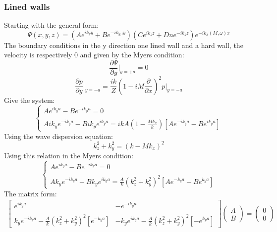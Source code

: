 \subsubsection*{Lined walls}\label{sec:EigenvalueLined}
Starting with the general form:
\begin{equation}
        \Psi(x,y,z)=(Ae^{ik_{y}y}+Be^{-ik_{y,l}y})(Ce^{ik_{z}z}+Dne^{-ik_{z}z})e^{-ik_{x}(M,\omega)x}
\end{equation}
The boundary conditions in the y direction one lined wall and a hard wall, the velocity is respectively 0 and given by the Myers condition:
\begin{equation}
    \frac{\partial\Psi}{\partial y} \Big|_{y=+a}=0
\end{equation}
\begin{equation}
    \frac{\partial p}{\partial y}\Bigg|_{y=-a}=\frac{ik}{Z}(1-iM\frac{\partial}{\partial x})^2 p\Bigg|_{y=-a}
\end{equation}
Give the system:
\begin{equation}\label{eq:2}
    \left\{
    \begin{array}{ll}
    Ae^{ik_ya}-Be^{-ik_ya}=0\\
        \\
    Aik_ye^{-ik_ya}-Bik_ye^{ik_ya}=ikA(1-\frac{Mk_x}{k})[Ae^{-ik_ya}-Be^{ik_ya}]
    \end{array}
    \right.
\end{equation}
Using the wave dispersion equation:
\begin{equation}
   k_z^2+k_y^2=(k-Mk_x)^2 
\end{equation}
Using this relation in the Myers condition:
\begin{equation}
    \left\{
    \begin{array}{ll}
    Ae^{ik_ya}-Be^{-ik_ya}=0\\
        \\
    Ak_ye^{-ik_ya}-Bk_ye^{ik_ya}=\frac{A}{k}(k_z^2+k_y^2)^2[Ae^{-k_ya}-Be^{k_ya}]
    \end{array}
    \right.
\end{equation}\label{eq:3}
The matrix form: 
 \begin{gather}
    \begin{bmatrix}
     e^{ik_ya} & -e^{-ik_ya} \\
      \\
     k_ye^{-ik_ya}-\frac{A}{k}(k_z^2+k_y^2)^2[e^{-k_ya}] & -k_ye^{ik_ya}-\frac{A}{k}(k_z^2+k_y^2)^2[-e^{k_ya}]
    \end{bmatrix}
    \begin{pmatrix}
       A\\
       B
    \end{pmatrix}
    =
    \begin{pmatrix}
      0\\
      0
    \end{pmatrix}
 \end{gather}
